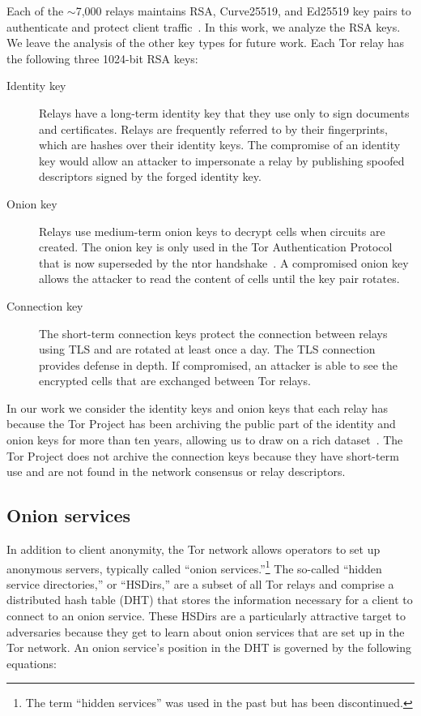 Each of the $\sim$7,000 relays maintains RSA, Curve25519, and Ed25519 key pairs
to authenticate and protect client traffic~\cite[\S~1.1]{torspec}. In this work,
we analyze the RSA keys.  We leave the analysis of the other key types for
future work.  Each Tor relay has the following three 1024-bit RSA keys:

\begin{description}
	\item[Identity key] Relays have a long-term identity key that they use only
		to sign documents and certificates.  Relays are frequently referred to
		by their fingerprints, which are hashes over their identity keys.  The
		compromise of an identity key would allow an attacker to impersonate a
		relay by publishing spoofed descriptors signed by the forged identity
		key.

	\item[Onion key]  Relays use medium-term onion keys to decrypt cells when
		circuits are created.  The onion key is only used in the Tor
		Authentication Protocol that is now superseded by the ntor
		handshake~\cite{Goldberg2013a}.  A compromised onion key allows the
		attacker to read the content of cells until the key pair rotates.

	\item[Connection key] The short-term connection keys protect the connection
		between relays using TLS and are rotated at least once a day.  The TLS
		connection provides defense in depth.  If compromised, an attacker is
		able to see the encrypted cells that are exchanged between Tor relays.
\end{description}

In our work we consider the identity keys and onion keys that each relay has
because the Tor Project has been archiving the public part of the identity and
onion keys for more than ten years, allowing us to draw on a rich
dataset~\cite{collector}. The Tor Project does not archive the connection keys
because they have short-term use and are not found in the network consensus or
relay descriptors.

\subsection{Onion services}
In addition to client anonymity, the Tor network allows operators to set up
anonymous servers, typically called ``onion services.''\footnote{The term ``hidden
services'' was used in the past but has been discontinued.} 
The so-called ``hidden service directories,'' or ``HSDirs,'' are a subset of all
Tor relays and comprise a distributed hash table (DHT) that stores the
information necessary for a client to connect to an onion service.  These HSDirs
are a particularly attractive target to adversaries because they get to learn
about onion services that are set up in the Tor network.  An onion service's
position in the DHT is governed by the following equations:

